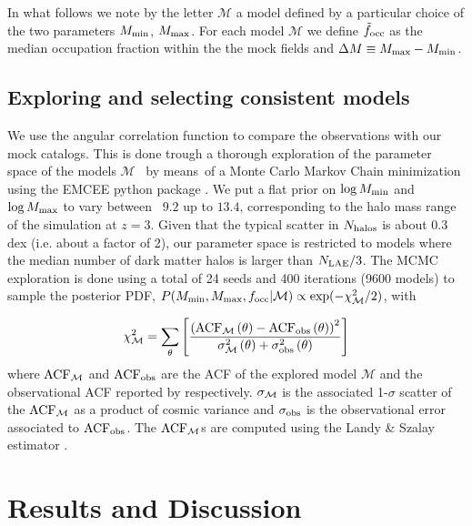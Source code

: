 \documentclass{emulateapj}
\newcommand{\mmin}{{\ifmmode{{M_{\rm min}}}\else{${M_{\rm min}}$}\fi}}
\newcommand{\mmax}{{\ifmmode{{M_{\rm max}}}\else{${M_{\rm max}}$}\fi}}
\begin{document}
In what follows we note by the letter ${\mathcal M}$ a model
defined by a particular choice of the two parameters $M_{\rm min}$, 
$M_{\rm  max}$. For each model  ${\mathcal M}$ we define $\tilde{f}_{\rm occ}$ as the median occupation fraction within the the mock fields and  $\Delta M \equiv \mmax-\mmin$.

\subsection{Exploring and selecting consistent models}

We use the angular correlation function to compare the observations with our mock catalogs. 
This is done trough a thorough exploration of the parameter space of the models ${\mathcal M}$  by  means of a Monte Carlo Markov Chain minimization using  the EMCEE python package \citep{emcee2013}.
We put a flat prior on $\log M_{\rm min}$ and $\log \mmax$ to vary between  $9.2$ up to $13.4$, corresponding to the halo mass range of the simulation at $z=3$. 
Given that the typical scatter  in $N_{\rm halos}$ is about 0.3 dex (i.e. about  a factor of 2), our parameter space is restricted to models where the median number of dark matter halos is larger than  $N_{\rm LAE}/3$. 
The MCMC exploration is done using a total of 24 seeds and 400 iterations (9600 models) to sample the posterior PDF,  $P(\mmin, \mmax, f_{\rm occ}| \mathcal{M}) \propto \exp(-\chi_{\mathcal M}^2/2)$, with

\begin{equation}
\chi_{\mathcal M}^2=\sum_{\theta}\left[\frac{\left( \rm{ACF}_{\mathcal M}\left(\theta\right) - \rm{ACF}_{\rm obs}\left(\theta\right)\right)^2}{ \sigma_{\rm \mathcal M}^{2}\left(\theta\right) + \sigma_{\rm obs}^{2}\left(\theta\right)}\right]
\end{equation}
%
where  $\rm{ACF}_{\mathcal M}$ and  $\rm{ACF}_{\rm obs}$ are the ACF of the explored model ${\mathcal M}$ and the observational ACF reported by \citet{Bielby16} respectively. $\sigma_{\rm \mathcal M}$ is the associated 1-$\sigma$ scatter 
of the $\rm{ACF}_{\mathcal M}$ as a product of cosmic variance and $\sigma_{\rm obs}$ is the observational error associated to $\rm{ACF}_{\rm obs}$.  The $\rm{ACF}_{\mathcal M}$s are computed using  the Landy \&  Szalay estimator  \citep{Landy1993}.




\section{Results and Discussion}
\end{document}
